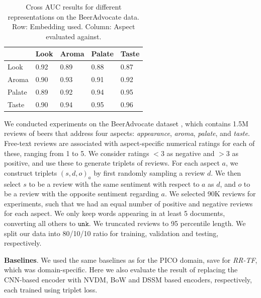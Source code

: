 \documentclass[11pt,a4paper]{article}
\begin{document}
\begin{table}%
\vspace{-.25em}
\footnotesize
    \centering
    \begin{tabularx}{\columnwidth}{ l X X X X }
     & Look & Aroma & Palate & Taste \\ \hline
    Look & 0.92 & 0.89 & 0.88 & 0.87 \\ 
    Aroma & 0.90 & 0.93 & 0.91 & 0.92 \\ 
    Palate & 0.89 & 0.92 & 0.94 & 0.95 \\ 
    Taste & 0.90 & 0.94 & 0.95 & 0.96 \\ 
    \end{tabularx}
    \vspace{-1em}
    \caption{Cross AUC results for different representations on the BeerAdvocate data. Row: Embedding used. Column: Aspect evaluated against. }
    \vspace{-1.5em}
    \label{table:beercrossauc}
\end{table}

We conducted experiments on the BeerAdvocate dataset \cite{mcauley2012learning}, which contains 1.5M reviews of beers that address four aspects: \emph{appearance}, \emph{aroma}, \emph{palate}, and \emph{taste}. Free-text reviews are associated with aspect-specific numerical ratings for each of these, ranging from 1 to 5. We consider ratings $<3$ as negative and $>3$ as positive, and use these to generate triplets of reviews. For each aspect $a$, we construct triplets $(s, d, o)_a$ by first randomly sampling a review $d$. We then select $s$ to be a review with the same sentiment with respect to $a$ as $d$, and $o$ to be a review with the opposite sentiment regarding $a$. We selected 90K reviews for experiments, such that we had an equal number of positive and negative reviews for each aspect. We only keep words appearing in at least 5 documents, converting all others to $\texttt{unk}$. We truncated reviews to 95 percentile length. We split our data into 80/10/10 ratio for training, validation and testing, respectively. %

\vspace{.25em}
\noindent \textbf{Baselines}. We used the same baselines as for the PICO domain, save for \emph{RR-TF}, which was domain-specific. Here we also evaluate the result of replacing the CNN-based encoder with NVDM, BoW and DSSM based encoders, respectively, each trained using triplet loss.%
\end{document}
